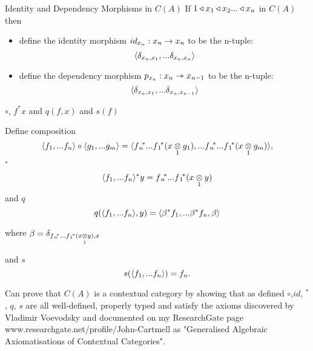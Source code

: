 \begin{frame}{Identity and Dependency Morphisms in $C(A)$}
If $1 \base x_1 \base x_2 ... \base x_n$ in $C(A)$
then 
\begin{itemize}
\item define the identity morphism $id_{x_n}:x_n \morph x_n$  
to be the n-tuple:
$$\tuple{\delta_{x_n,x_1},...\delta_{x_n,x_n}}$$
\item define the dependency morphism $p_{x_n}:x_n \smorph x_{n-1}$ to be the n-tuple:
$$\tuple{\delta_{x_n,x_1},...\delta_{x_n,x_{n-1}}}$$
\end{itemize}
\end{frame}


\iffalse{
\begin{frame}{Composition of morphisms}
Composition of morphisms is defined as follows.

$$\tuple{f_1,...f_n}\circ \tuple{g_1,...g_m} 
=\tuple{\fnvectorstar(\crossx{x}{g_1}{1}),...\fnvectorstar(\crossx{x}{g_m}{1})}
$$
\end{frame}
}\fi

\begin{frame}{$\circ$, $f^*x$ and $q(f,x)$ and $s(f)$}
\newcommand{\pullbackobject}{\fnvectorstar(\crossx{x}{y}{1})}
\newcommand{\deltaterm}{\delta_{\pullbackobject,x}}

Define composition
\begin{equation} 
\tuple{f_1,...f_n}\circ \tuple{g_1,...g_m} 
=\tuple{\fnvectorstar(\crossx{x}{g_1}{1}),...\fnvectorstar(\crossx{x}{g_m}{1})},
\end{equation}
$^*$ 
\begin{equation} 
\tuple{\fn}^*y=\pullbackobject
\end{equation}
and $q$ 
\begin{equation} 
q(\tuple{\fn},y)=
\tuple{{\beta}^*f_1,...{\beta}^*f_n,\beta}
\end{equation}

where 
$\beta = \deltaterm$

and $s$ 
\begin{equation} 
s(\tuple{\fn})=f_n.
\end{equation}

Can prove that $C(A)$ is a contextual category by showing that as defined
$\circ$,$id$, $^*$, $q$, $s$ are all well-defined, properly typed and satisfy the axioms discovered by Vladimir Voevodsky and documented on my ResearchGate page
www.researchgate.net/profile/John-Cartmell
as 
"Generalised Algebraic Axiomatisations of Contextual Categories".
\end{frame}


